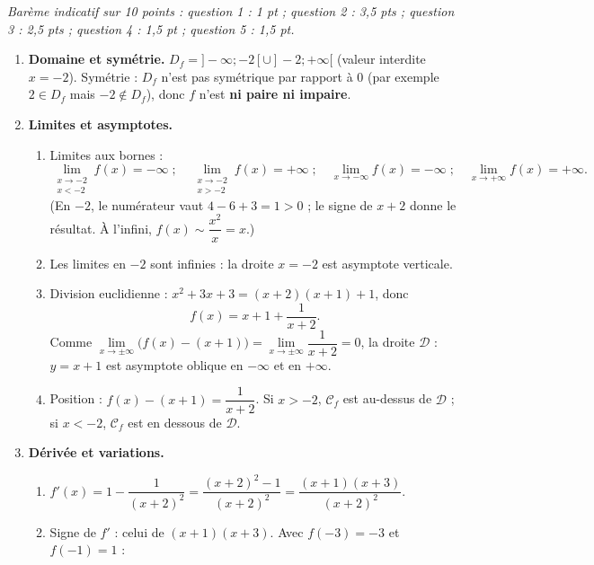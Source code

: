 \documentclass[11pt]{article}
\newcommand{\cle}[1]{{\popxbold\color{popdark}#1}}
\begin{document}
\begin{corrige}
\emph{Barème indicatif sur 10 points : question 1 : 1 pt ; question 2 : 3,5 pts ; question 3 : 2,5 pts ; question 4 : 1,5 pt ; question 5 : 1,5 pt.}

\begin{enumerate}
\item \textbf{Domaine et symétrie.} $D_f=]-\infty;-2[\cup]-2;+\infty[$ (valeur interdite $x=-2$).
Symétrie : $D_f$ n'est pas symétrique par rapport à $0$ (par exemple $2\in D_f$ mais $-2\notin D_f$), donc $f$ n'est \textbf{ni paire ni impaire}.

\item \textbf{Limites et asymptotes.}
\begin{enumerate}
\item Limites aux bornes :
\[ \lim_{\substack{x\to -2\\x<-2}}f(x)=-\infty \;;\quad \lim_{\substack{x\to -2\\x>-2}}f(x)=+\infty \;;\quad \lim_{x\to-\infty}f(x)=-\infty \;;\quad \lim_{x\to+\infty}f(x)=+\infty. \]
(En $-2$, le numérateur vaut $4-6+3=1>0$ ; le signe de $x+2$ donne le résultat. À l'infini, $f(x)\sim\dfrac{x^2}{x}=x$.)

\item Les limites en $-2$ sont infinies : la droite $x=-2$ est \cle{asymptote verticale}.

\item Division euclidienne : $x^2+3x+3=(x+2)(x+1)+1$, donc
\[ f(x)=x+1+\frac{1}{x+2}. \]
Comme $\lim\limits_{x\to\pm\infty}\bigl(f(x)-(x+1)\bigr)=\lim\limits_{x\to\pm\infty}\dfrac{1}{x+2}=0$, la droite $\mathcal{D}$ : $y=x+1$ est \cle{asymptote oblique} en $-\infty$ et en $+\infty$.

\item Position : $f(x)-(x+1)=\dfrac{1}{x+2}$.
Si $x>-2$, $\mathcal{C}_f$ est au-dessus de $\mathcal{D}$ ; si $x<-2$, $\mathcal{C}_f$ est en dessous de $\mathcal{D}$.
\end{enumerate}

\item \textbf{Dérivée et variations.}
\begin{enumerate}
\item $f'(x)=1-\dfrac{1}{(x+2)^2}=\dfrac{(x+2)^2-1}{(x+2)^2}=\dfrac{(x+1)(x+3)}{(x+2)^2}$.

\item Signe de $f'$ : celui de $(x+1)(x+3)$. Avec $f(-3)=-3$ et $f(-1)=1$ :


\end{enumerate}
\end{enumerate}
\end{corrige}
\end{document}
